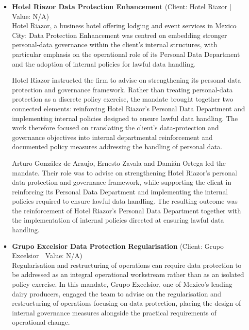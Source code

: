 \documentclass[11pt]{article}
\begin{document}
\begin{itemize}
Accordingly, the Biocodex Data Protection Framework matter evidences implementation-led advice that combined framework design, framework implementation, internal controls and the creation of a dedicated Personal Data Protection Department.
\item \textbf{Hotel Riazor Data Protection Enhancement} (Client: Hotel Riazor | Value: N/A)\\ Hotel Riazor, a business hotel offering lodging and event services in Mexico City: Data Protection Enhancement was centred on embedding stronger personal-data governance within the client’s internal structures, with particular emphasis on the operational role of its Personal Data Department and the adoption of internal policies for lawful data handling.

Hotel Riazor instructed the firm to advise on strengthening its personal data protection and governance framework. Rather than treating personal-data protection as a discrete policy exercise, the mandate brought together two connected elements: reinforcing Hotel Riazor’s Personal Data Department and implementing internal policies designed to ensure lawful data handling. The work therefore focused on translating the client’s data-protection and governance objectives into internal departmental reinforcement and documented policy measures addressing the handling of personal data.

Arturo González de Araujo, Ernesto Zavala and Damián Ortega led the mandate. Their role was to advise on strengthening Hotel Riazor’s personal data protection and governance framework, while supporting the client in reinforcing its Personal Data Department and implementing the internal policies required to ensure lawful data handling. The resulting outcome was the reinforcement of Hotel Riazor’s Personal Data Department together with the implementation of internal policies directed at ensuring lawful data handling.
\item \textbf{Grupo Excelsior Data Protection Regularisation} (Client: Grupo Excelsior | Value: N/A)\\ Regularisation and restructuring of operations can require data protection to be addressed as an integral operational workstream rather than as an isolated policy exercise. In this mandate, Grupo Excelsior, one of Mexico’s leading dairy producers, engaged the team to advise on the regularisation and restructuring of operations focusing on data protection, placing the design of internal governance measures alongside the practical requirements of operational change.


\end{itemize}
\end{document}
